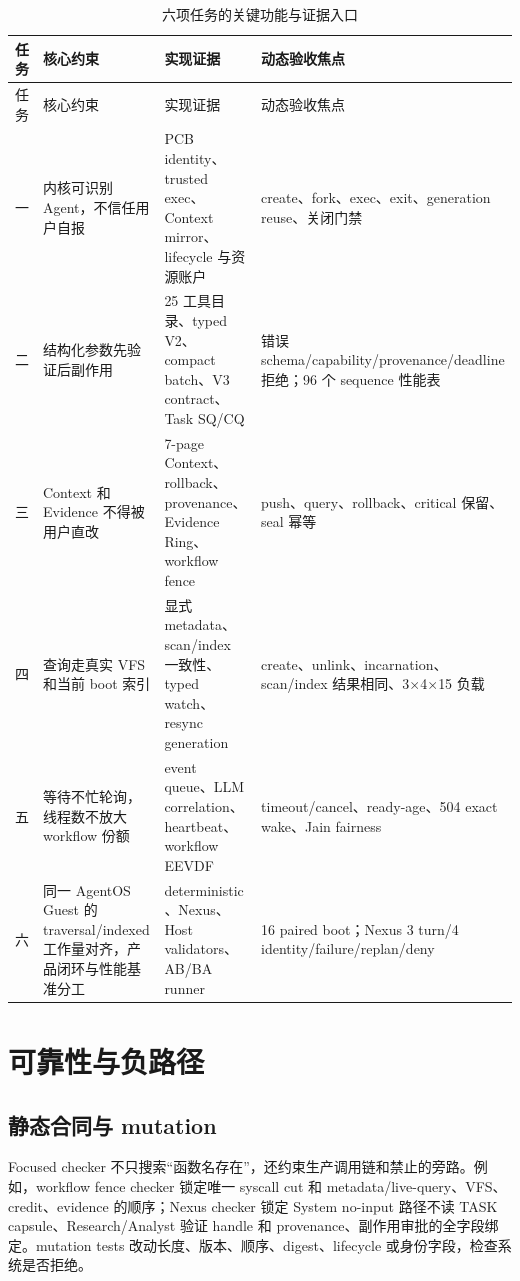 \begin{longtable}{L{1.2cm}L{3.0cm}L{5.6cm}L{3.1cm}}
  \caption{六项任务的关键功能与证据入口}\label{tab:function-matrix}\\
  \toprule
  任务 & 核心约束 & 实现证据 & 动态验收焦点 \\
  \midrule
  \endfirsthead
  \toprule
  任务 & 核心约束 & 实现证据 & 动态验收焦点 \\
  \midrule
  \endhead
  一 & 内核可识别 Agent，不信任用户自报 & PCB identity、trusted exec、Context mirror、lifecycle 与资源账户 & create、fork、exec、exit、generation reuse、关闭门禁 \\
  二 & 结构化参数先验证后副作用 & 25 工具目录、typed V2、compact batch、V3 contract、Task SQ/CQ & 错误 schema/capability/provenance/deadline 拒绝；96 个 sequence 性能表 \\
  三 & Context 和 Evidence 不得被用户直改 & 7-page Context、rollback、provenance、Evidence Ring、workflow fence & push、query、rollback、critical 保留、seal 幂等 \\
  四 & 查询走真实 VFS 和当前 boot 索引 & 显式 metadata、scan/index 一致性、typed watch、resync generation & create、unlink、incarnation、scan/index 结果相同、3$\times$4$\times$15 负载 \\
  五 & 等待不忙轮询，线程数不放大 workflow 份额 & event queue、LLM correlation、heartbeat、workflow EEVDF & timeout/cancel、ready-age、504 exact wake、Jain fairness \\
  六 & 同一 AgentOS Guest 的 traversal/indexed 工作量对齐，产品闭环与性能基准分工 & deterministic 、Nexus、Host validators、AB/BA runner & 16 paired boot；Nexus 3 turn/4 identity/failure/replan/deny \\
  \bottomrule
\end{longtable}

\section{可靠性与负路径}

\subsection{静态合同与 mutation}

Focused checker 不只搜索“函数名存在”，还约束生产调用链和禁止的旁路。例如，workflow fence checker 锁定唯一 syscall cut 和 metadata/live-query、VFS、credit、evidence 的顺序；Nexus checker 锁定 System no-input 路径不读 TASK capsule、Research/Analyst 验证 handle 和 provenance、副作用审批的全字段绑定。mutation tests 改动长度、版本、顺序、digest、lifecycle 或身份字段，检查系统是否拒绝。

